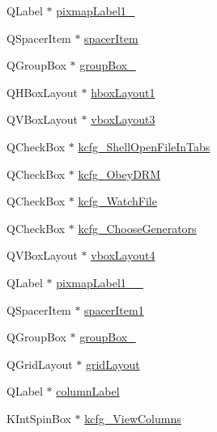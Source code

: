 \begin{DoxyCompactItemize}
\item 
Q\+Label $\ast$ \hyperlink{classUi__DlgGeneralBase_ad5978e3e0b3caa214086a2dfa6e10a4f}{pixmap\+Label1\+\_}
\item 
Q\+Spacer\+Item $\ast$ \hyperlink{classUi__DlgGeneralBase_ac1694bcde138dc57b7fd0a63e778ccc2}{spacer\+Item}
\item 
Q\+Group\+Box $\ast$ \hyperlink{classUi__DlgGeneralBase_ae822e688fc0f616b4a29511bc5615a3d}{group\+Box\+\_}
\item 
Q\+H\+Box\+Layout $\ast$ \hyperlink{classUi__DlgGeneralBase_a2db865b00918e93123eb63bf71b083d2}{hbox\+Layout1}
\item 
Q\+V\+Box\+Layout $\ast$ \hyperlink{classUi__DlgGeneralBase_a457d320b774578a19aeb92dbe19f128e}{vbox\+Layout3}
\item 
Q\+Check\+Box $\ast$ \hyperlink{classUi__DlgGeneralBase_abb932ae5a296f99d600ae0bd76423797}{kcfg\+\_\+\+Shell\+Open\+File\+In\+Tabs}
\item 
Q\+Check\+Box $\ast$ \hyperlink{classUi__DlgGeneralBase_ae06aa2913c5352f7291531fa8709216f}{kcfg\+\_\+\+Obey\+D\+R\+M}
\item 
Q\+Check\+Box $\ast$ \hyperlink{classUi__DlgGeneralBase_ad78f563114498d2bcc4350d8939ad2ec}{kcfg\+\_\+\+Watch\+File}
\item 
Q\+Check\+Box $\ast$ \hyperlink{classUi__DlgGeneralBase_ad63d50a9664ae9d855e43ac1a95e3629}{kcfg\+\_\+\+Choose\+Generators}
\item 
Q\+V\+Box\+Layout $\ast$ \hyperlink{classUi__DlgGeneralBase_a860af4a09b00b3bd9ab821e64a5aaa18}{vbox\+Layout4}
\item 
Q\+Label $\ast$ \hyperlink{classUi__DlgGeneralBase_abf82683d25a444dcffa83917ac9f75a4}{pixmap\+Label1\+\_\+\_}
\item 
Q\+Spacer\+Item $\ast$ \hyperlink{classUi__DlgGeneralBase_a226899c716df5b8ce150c996cd8059c4}{spacer\+Item1}
\item 
Q\+Group\+Box $\ast$ \hyperlink{classUi__DlgGeneralBase_a14484da34e83830a42cd4929ba2c7d86}{group\+Box\+\_}
\item 
Q\+Grid\+Layout $\ast$ \hyperlink{classUi__DlgGeneralBase_ae149cf7331bb8bdd9c3f8dabdde003e4}{grid\+Layout}
\item 
Q\+Label $\ast$ \hyperlink{classUi__DlgGeneralBase_ad6a70134bad0df0f344b5ec449ad9995}{column\+Label}
\item 
K\+Int\+Spin\+Box $\ast$ \hyperlink{classUi__DlgGeneralBase_a8951356ecfac9ee4a27ea0b2bca2e12e}{kcfg\+\_\+\+View\+Columns}
\item 

\end{DoxyCompactItemize}
